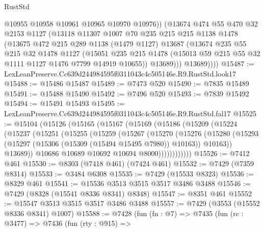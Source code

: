 \begin{lexlean}{RustStd}
\begin{coremodule}
              @10955
              @10958
              @10961
              @10965
              @10970
              @10976))
          (@13674
            @474
            @55
            @470
            @32
            @2153
            @1127
            (@13118
              @11307
              @1007
              @70
              @235
              @215
              @215
              @1138
              @1478
              (@13675
                @472
                @215
                @289
                @1138
                (@1479 @1127)
                @13687
                (@13674
                  @235
                  @55
                  @215
                  @32
                  @1478
                  @1127
                  (@15051
                    @235
                    @215
                    @1478
                    (@15013 @59 @215 @55 @32 @1111 @1127 @1476 @7799 @14919 @10655))
                  @13689)))
            @13689))))
@15487 := LexLeanPreserve.Cc639d244984595f0311043c4c505146e.R9.RustStd.look17
@15488 := @15486 @15487
@15489 := @7473 @520
@15490 := @7835 @15489
@15491 := @15488 @15490
@15492 := @7496 @520
@15493 := @7839 @15492
@15494 := @15491 @15493
@15495 := LexLeanPreserve.Cc639d244984595f0311043c4c505146e.R9.RustStd.fal17
@15525 := @15104
    (@15126
      (@15165
        (@15167
          (@15169
            (@15186
              (@15209
                (@15224
                  (@15237
                    (@15251
                      (@15255
                        (@15259
                          (@15267
                            (@15270
                              (@15276
                                (@15280
                                  (@15293
                                    (@15297 (@15306 (@15309 (@15494 @15495 @7980)) @10163))
                                    @10163))
                                @13689))
                            @10686
                            @10689
                            @10692
                            @10694
                            @8000))))))))))))
@15526 := @7412 @461
@15530 := @8303 (@7418 @461) (@7424 @461)
@15532 := @7429 (@7359 @8314)
@15533 := @3484 @6308
@15535 := @7429 (@15533 @8323)
@15536 := @8329 @461
@15541 := @15536 @3513 @3515 @3517 @3486 @3488
@15546 := @7429 (@8328 (@15541 @8336 @8341) @8348)
@15547 := @8351 @461
@15552 := @15547 @3513 @3515 @3517 @3486 @3488
@15557 := @7429 (@3553 (@15552 @8336 @8341) @1007)
@15588 := @7428
    (fun (fn : @7) =>
    @7435
      (fun (rc : @3477) =>
      @7436
        (fun (rty : @915) =>

\end{coremodule}
\end{lexlean}
